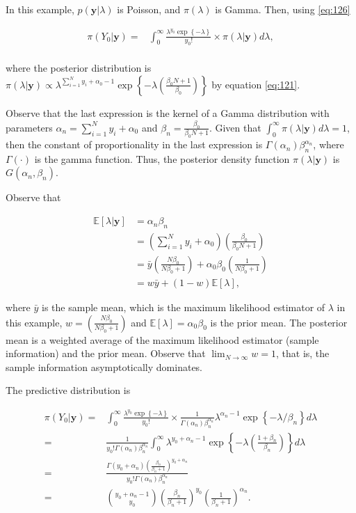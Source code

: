 In this example, $p(\mathbf{y}|\lambda)$ is Poisson, and $\pi(\lambda)$ is Gamma. Then, using \ref{eq:126} 

\begin{align*}
	\pi(Y_0|\mathbf{y})=&\int_{0}^{\infty}\frac{\lambda^{y_0}\exp\left\{-\lambda\right\}}{y_0!}\times \pi(\lambda|\mathbf{y})d\lambda,\\
\end{align*}

where the posterior distribution is $\pi(\lambda|\mathbf{y})\propto \lambda^{\sum_{i=1}^N y_i + \alpha_0 - 1}\exp\left\{-\lambda\left(\frac{\beta_0 N+1}{\beta_0}\right)\right\}$ by equation \ref{eq:121}.

Observe that the last expression is the kernel of a Gamma distribution with parameters $\alpha_n=\sum_{i=1}^N y_i + \alpha_0$ and $\beta_n=\frac{\beta_0}{\beta_0 N + 1}$. Given that $\int_0^{\infty}\pi(\lambda|\mathbf{y})d\lambda=1$, then the constant of proportionality in the last expression is $\Gamma(\alpha_n)\beta_n^{\alpha_n}$, where $\Gamma(\cdot)$ is the gamma function. Thus, the posterior density function $\pi(\lambda|\mathbf{y})$ is $G(\alpha_n,\beta_n)$.

Observe that 

\begin{align*}
	\mathbb{E}[\lambda|\mathbf{y}]&=\alpha_n\beta_n\\
	&=\left(\sum_{i=1}^N y_i + \alpha_0\right)\left(\frac{\beta_0}{\beta_0 N + 1}\right)\\
	&=\bar{y}\left(\frac{N\beta_0}{N\beta_0+1}\right)+\alpha_0\beta_0\left(\frac{1}{N\beta_0+1}\right)\\
	&=w\bar{y}+(1-w)\mathbb{E}[\lambda],
\end{align*}

where $\bar{y}$ is the sample mean, which is the maximum likelihood estimator of $\lambda$ in this example, $w=\left(\frac{N\beta_0}{N\beta_0+1}\right)$ and $\mathbb{E}[\lambda]=\alpha_0\beta_0$ is the prior mean. The posterior mean is a weighted average of the maximum likelihood estimator (sample information) and the prior mean. Observe that $\lim_{N\rightarrow\infty}w= 1$, that is, the sample information asymptotically dominates.

The predictive distribution is

\begin{align*}
	\pi(Y_0|\mathbf{y})=&\int_{0}^{\infty}\frac{\lambda^{y_0}\exp\left\{-\lambda\right\}}{y_0!}\times \frac{1}{\Gamma(\alpha_n)\beta_n^{\alpha_n}}\lambda^{\alpha_n-1}\exp\left\{-\lambda/\beta_n\right\} d\lambda\\
	=&\frac{1}{y_0!\Gamma(\alpha_n)\beta_n^{\alpha_n}}\int_{0}^{\infty}\lambda^{y_0+\alpha_n-1}\exp\left\{-\lambda\left(\frac{1+\beta_n}{\beta_n}\right)\right\}d\lambda\\
	=&\frac{\Gamma(y_0+\alpha_n)\left(\frac{\beta_n}{\beta_n+1}\right)^{y_0+\alpha_n}}{y_0!\Gamma(\alpha_n)\beta_n^{\alpha_n}}\\
	=&{y_0+\alpha_n-1 \choose y_0}\left(\frac{\beta_n}{\beta_n+1}\right)^{y_0}\left(\frac{1}{\beta_n+1}\right)^{\alpha_n}.
\end{align*}

